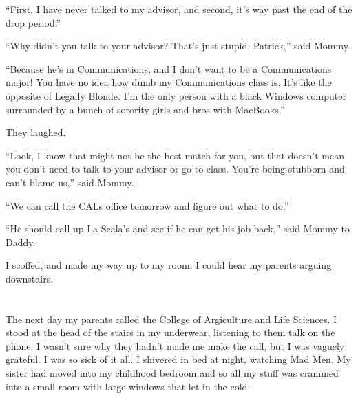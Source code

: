 ``First, I have never talked to my advisor, and second, it's way past the end of
the drop period.''

``Why didn't you talk to your advisor?  That's just stupid, Patrick,'' said Mommy.

``Because he's in Communications, and I don't want to be a Communications major!
You have no idea how dumb my Communications class is.  It's like the opposite of
Legally Blonde.  I'm the only person with a black Windows computer surrounded by
a bunch of sorority girls and bros with MacBooks.''

They laughed.

``Look, I know that might not be the best match for you, but that doesn't mean
you don't need to talk to your advisor or go to class.  You're being stubborn
and can't blame us,'' said Mommy.

``We can call the CALs office tomorrow and figure out what to do.''

``He should call up La Scala's and see if he can get his job back,'' said Mommy to
Daddy.

I scoffed, and made my way up to my room.  I could hear my parents arguing
downstairs.

\section{}

The next day my parents called the College of Argiculture and Life Sciences.  I
stood at the head of the stairs in my underwear, listening to them talk on the
phone.  I wasn't sure why they hadn't made me make the call, but I was vaguely
grateful.  I was so sick of it all.  I shivered in bed at night, watching Mad
Men.  My sister had moved into my childhood bedroom and so all my stuff was
crammed into a small room with large windows that let in the cold.  
